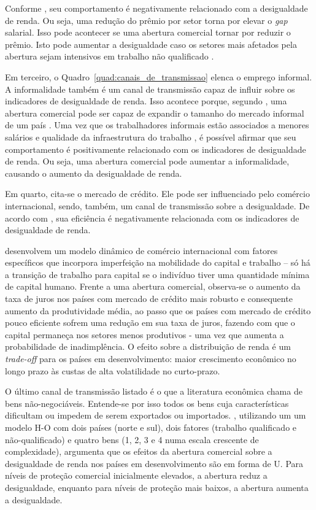 Conforme \textcite{goldbergpavcnik04}, seu comportamento é negativamente relacionado com a desigualdade de renda. Ou seja, uma redução do prêmio por setor torna por elevar o \textit{gap} salarial. Isso pode acontecer se uma abertura comercial tornar por reduzir o prêmio. Isto pode aumentar a desigualdade caso os setores mais afetados pela abertura sejam intensivos em trabalho não qualificado \cite{pavcnik04}.

Em terceiro, o Quadro~\ref{quad:canais_de_transmissao} elenca o emprego informal. A informalidade também é um canal de transmissão capaz de influir sobre os indicadores de desigualdade de renda. Isso acontece porque, segundo \textcite{goldbergpavcnik04}, uma abertura comercial pode ser capaz de expandir o tamanho do mercado informal de um país \cite{goldberg03}. Uma vez que os trabalhadores informais estão associados a menores salários e qualidade da infraestrutura do trabalho \cite{bargain14}, é possível afirmar que seu comportamento é positivamente relacionado com os indicadores de desigualdade de renda. Ou seja, uma abertura comercial pode aumentar a informalidade, causando o aumento da desigualdade de renda.

Em quarto, cita-se o mercado de crédito. Ele pode ser influenciado pelo comércio internacional, sendo, também, um canal de transmissão sobre a desigualdade. De acordo com \textcite{goldbergpavcnik04}, sua eficiência é negativamente relacionada com os indicadores de desigualdade de renda.

\textcite{banerjee04} desenvolvem um modelo dinâmico de comércio internacional com fatores específicos que incorpora imperfeição na mobilidade do capital e trabalho -- só há a transição de trabalho para capital se o indivíduo tiver uma quantidade mínima de capital humano. Frente a uma abertura comercial, observa-se o aumento da taxa de juros nos países com mercado de crédito mais robusto e consequente aumento da produtividade média, ao passo que os países com mercado de crédito pouco eficiente sofrem uma redução em sua taxa de juros, fazendo com que o capital permaneça nos setores menos produtivos - uma vez que aumenta a probabilidade de inadimplência. O efeito sobre a distribuição de renda é um \textit{trade-off} para os países em desenvolvimento: maior crescimento econômico no longo prazo às custas de alta volatilidade no curto-prazo.

O último canal de transmissão listado é o que a literatura econômica chama de bens não-negociáveis. Entende-se por isso todos os bens cuja características dificultam ou impedem de serem exportados ou importados. \textcite{xu03}, utilizando um um modelo H-O com dois países (norte e sul), dois fatores (trabalho qualificado e não-qualificado) e quatro bens (1, 2, 3 e 4 numa escala crescente de complexidade), argumenta que os efeitos da abertura comercial sobre a desigualdade de renda nos países em desenvolvimento são em forma de U. Para níveis de proteção comercial inicialmente elevados, a abertura reduz a desigualdade, enquanto para níveis de proteção mais baixos, a abertura aumenta a desigualdade.

